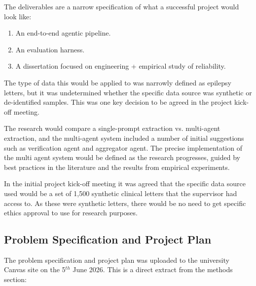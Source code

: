 \documentclass[conference]{IEEEtran}
\begin{document}
The deliverables are a narrow specification of
what a successful project would look like:

\begin{enumerate}
\item An end-to-end agentic pipeline.
\item An evaluation harness.
\item A dissertation focused on engineering + empirical study of reliability.
\end{enumerate}

The type of data this would be applied to was
narrowly defined as epilepsy letters, but it
was undetermined whether the specific data 
source was synthetic or de-identified samples. 
This was one key decision to be agreed 
in the project kick-off meeting.

The research would compare a single-prompt
extraction vs. multi-agent extraction, and the
multi-agent system included a number of 
initial suggestions such as verification agent
and aggregator agent. The precise 
implementation of the multi agent system would be
defined as the research progresses, guided by best 
practices in the literature and the results from 
empirical experiments.

In the initial project kick-off meeting it was 
agreed that the specific data source used
would be a set of 1,500 synthetic clinical 
letters that the supervisor had access to. 
As these were synthetic letters, there would
be no need to get specific ethics approval 
to use for research purposes. 

\subsection{Problem Specification and Project Plan}

The problem specification and project plan was 
uploaded to the university Canvas site on the
5$^{th}$ June 2026. This is a direct extract 
from the methods section:
\end{document}
